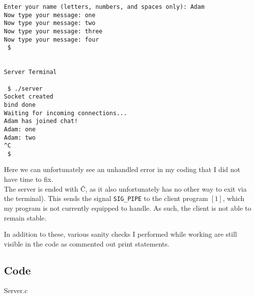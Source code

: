 \documentclass[titlepage, 14pt]{article}
\begin{document}
\begin{enumerate}
\begin{enumerate}
\begin{verbatim}
Enter your name (letters, numbers, and spaces only): Adam
Now type your message: one
Now type your message: two
Now type your message: three
Now type your message: four
 $ 


Server Terminal

 $ ./server
Socket created
bind done
Waiting for incoming connections...
Adam has joined chat!
Adam: one
Adam: two
^C
 $
\end{verbatim} 
Here we can unfortunately see an unhandled error in my coding that I did not have time to fix. \\
The server is ended with \^C, as it also unfortunately has no other way to exit via the terminal). This sends the signal \verb|SIG_PIPE| to the client program $[1]$, which my program is not currently equipped to handle. As such, the client is not able to remain stable. 
      
  \end{enumerate}
\end{enumerate}
In addition to these, various sanity checks I performed while working are still visible in the code as commented out print statements.

\subsection{Code}

\begin{center} 
  Server.c
\end{center}
\end{document}
